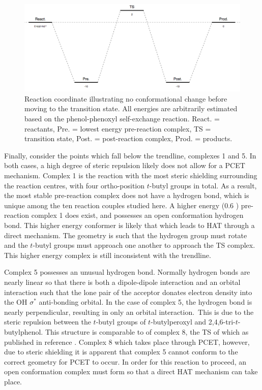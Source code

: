 \begin{figure}[htb]
  \centering
  \includegraphics[width=\textwidth]{figures/afactor-direct.png}
  \caption[Reaction coordinate illustrating no conformational change before moving to the transition state.]{Reaction coordinate illustrating no conformational change before moving to the transition state. All energies are arbitrarily estimated based on the phenol-phenoxyl self-exchange reaction. React. = reactants, Pre. = lowest energy pre-reaction complex, TS = transition state, Post. = post-reaction complex, Prod. = products.}
\label{fig:afactor-direct}
\end{figure}

Finally, consider the points which fall below the trendline, complexes 1 and 5. In both cases, a high degree of steric repulsion likely does not allow for a PCET mechanism. Complex 1 is the reaction with the most steric shielding surrounding the reaction centres, with four ortho-position $t$-butyl groups in total. As a result, the most stable pre-reaction complex does not have a hydrogen bond, which is unique among the ten reaction couples studied here. A higher energy (0.6 \kcalmol) pre-reaction complex 1 does exist, and possesses an open conformation hydrogen bond. This higher energy conformer is likely that which leads to HAT through a direct mechanism. The geometry is such that the hydrogen group must rotate and the $t$-butyl groups must approach one another to approach the TS complex. This higher energy complex is still inconsistent with the trendline.

Complex 5 possesses an unusual hydrogen bond. Normally hydrogen bonds are nearly linear so that there is both a dipole-dipole interaction and an orbital interaction such that the lone pair of the acceptor donates electron density into the OH $\sigma^*$ anti-bonding orbital.\cite{Jeffrey1997} In the case of complex 5, the hydrogen bond is nearly perpendicular, resulting in only an orbital interaction.\footnotemark~This is due to the steric repulsion between the $t$-butyl groups of $t$-butylperoxyl and 2,4,6-tri-$t$-butylphenol. This structure is comparable to of complex 8, the TS of which as published in reference . Complex 8 which takes place through PCET, however, due to steric shielding it is apparent that complex 5 cannot conform to the correct geometry for PCET to occur. In order for this reaction to proceed, an open conformation complex must form so that a direct HAT mechanism can take place.

